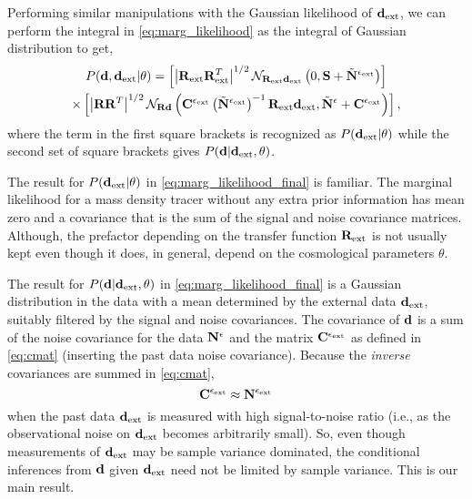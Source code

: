 \documentclass[prd, onecolumn, nofootinbib, floatfix]{revtex4-1}
\begin{document}
Performing similar manipulations with the Gaussian likelihood of $\mathbf{d}_{\rm ext}$, we can 
perform the integral in \autoref{eq:marg_likelihood} as the integral of Gaussian distribution to get,
\begin{multline}\label{eq:marg_likelihood_final}
	P(\mathbf{d}, \mathbf{d}_{\rm ext} | \theta) =
	\left[
	\left|\mathbf{R}_{\rm ext}\mathbf{R}_{\rm ext}^{T}\right|^{1/2}
	\mathcal{N}_{\mathbf{R}_{\rm ext}\mathbf{d}_{\rm ext}} \left(0, \mathbf{S} + \tilde{\mathbf{N}}^{\epsilon_{\rm ext}}\right)
	\right]
	\\ \times
	\left[
	\left|\mathbf{R}\mathbf{R}^{T}\right|^{1/2}
	\mathcal{N}_{\mathbf{R}\mathbf{d}} \left(\mathbf{C}^{\epsilon_{\rm ext}}\left(\tilde{\mathbf{N}}^{\epsilon_{\rm ext}}\right)^{-1}\mathbf{R}_{\rm ext}\mathbf{d}_{\rm ext}, 
	\tilde{\mathbf{N}}^{\epsilon} + \mathbf{C}^{\epsilon_{\rm ext}}\right)
	\right],
\end{multline}
where the term in the first square brackets is recognized as $P(\mathbf{d}_{\rm ext} | \theta)$ while the 
second set of square brackets gives $P(\mathbf{d} | \mathbf{d}_{\rm ext}, \theta)$.

The result for $P(\mathbf{d}_{\rm ext}|\theta)$ in \autoref{eq:marg_likelihood_final} is familiar. The 
marginal likelihood for a mass density tracer without any extra prior information has mean zero 
and a covariance that is the sum of the signal and noise covariance matrices. Although, the 
prefactor depending on the transfer function $\mathbf{R}_{\rm ext}$ is not usually kept even though it 
does, in general, depend on the cosmological parameters $\theta$.

The result for $P(\mathbf{d}|\mathbf{d}_{\rm ext},\theta)$ in \autoref{eq:marg_likelihood_final} is a Gaussian 
distribution in the data with a mean determined by the external data $\mathbf{d}_{\rm ext}$, suitably filtered 
by the signal and noise covariances. The covariance of $\mathbf{d}$ is a sum 
of the noise covariance for the data $\mathbf{N}^{\epsilon}$ and the matrix $\mathbf{C}^{\epsilon_{\rm ext}}$ as defined in 
\autoref{eq:cmat} (inserting the past data noise covariance). Because the \emph{inverse} 
covariances are summed in \autoref{eq:cmat},
\begin{equation}
	\mathbf{C}^{\epsilon_{\rm ext}} \approx \mathbf{N}^{\epsilon_{\rm ext}}
\end{equation}
when the past data $\mathbf{d}_{\rm ext}$ is measured with high signal-to-noise ratio (i.e., as the observational 
noise on $\mathbf{d}_{\rm ext}$ becomes arbitrarily small). So, even though measurements of $\mathbf{d}_{\rm ext}$ may be 
sample variance dominated, the conditional inferences from $\mathbf{d}$ given $\mathbf{d}_{\rm ext}$ need not be 
limited by sample variance. This is our main result.
\end{document}
